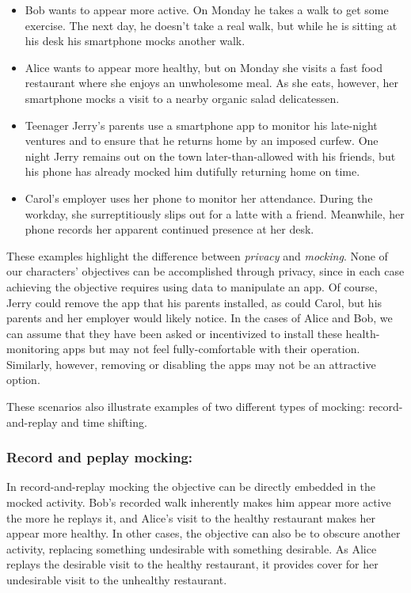 \begin{itemize}

\item Bob wants to appear more active. On Monday he takes a walk to get some
exercise. The next day, he doesn't take a real walk, but while he is sitting
at his desk his smartphone mocks another walk.

\item Alice wants to appear more healthy, but on Monday she visits a fast
food restaurant where she enjoys an unwholesome meal. As she eats, however, her
smartphone mocks a visit to a nearby organic salad delicatessen.

\item Teenager Jerry's parents use a smartphone app to monitor his late-night
  ventures and to ensure that he returns home by an imposed curfew. One
  night Jerry remains out on the town later-than-allowed with his friends,
  but his phone has already mocked him dutifully returning home on time.

\item Carol's employer uses her phone to monitor her attendance. During the
workday, she surreptitiously slips out for a latte with a friend.  Meanwhile,
her phone records her apparent continued presence at her desk.

\end{itemize}

These examples highlight the difference between \textit{privacy} and
\textit{mocking}. None of our characters' objectives can be accomplished
through privacy, since in each case achieving the objective requires using
data to manipulate an app. Of course, Jerry could remove the app that his
parents installed, as could Carol, but his parents and her employer would
likely notice. In the cases of Alice and Bob, we can assume that
they have been asked or incentivized to install these health-monitoring apps
but may not feel fully-comfortable with their operation. Similarly, however,
removing or disabling the apps may not be an attractive option. 

These scenarios also illustrate examples of two different types of
mocking: record-and-replay and time shifting.

\subsubsection{Record and peplay mocking:\space}

In record-and-replay mocking the objective can be directly embedded in the
mocked activity. Bob's recorded walk inherently makes him appear more active
the more he replays it, and Alice's visit to the healthy restaurant makes her
appear more healthy. In other cases, the objective can also be to obscure
another activity, replacing something undesirable with something desirable.
As Alice replays the desirable visit to the healthy restaurant, it provides
cover for her undesirable visit to the unhealthy restaurant.

